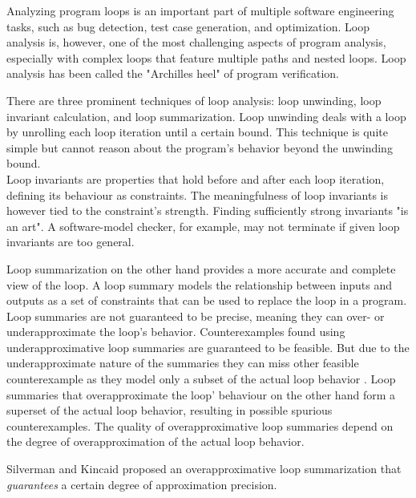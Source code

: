 Analyzing program loops is an important part of multiple software engineering tasks, such as bug detection, test case generation, and optimization. Loop analysis is, however, one of the most challenging aspects of program analysis, especially with complex loops that feature multiple paths and nested loops. Loop analysis has been called the "Archilles heel" of program verification\cite{DBLP:journals/fmsd/KroeningSTTW13}. \par
There are three prominent techniques of loop analysis: loop unwinding, loop invariant calculation, and loop summarization\cite{DBLP:journals/fmsd/KroeningSTTW13 , DBLP:conf/cav/SilvermanK19, DBLP:journals/tse/XieCZLLL19}. Loop unwinding deals with a loop by unrolling each loop iteration until a certain bound. This technique is quite simple but cannot reason about the program's behavior beyond the unwinding bound. \\
Loop invariants are properties that hold before and after each loop iteration, defining its behaviour as constraints. The meaningfulness of loop invariants is however tied to the constraint's strength. Finding sufficiently strong invariants "is an art"\cite{DBLP:journals/fmsd/KroeningSTTW13}. A software-model checker, for example, may not terminate if given loop invariants are too general. \par
Loop summarization on the other hand provides a more accurate and complete view of the loop. A loop summary models the relationship between inputs and outputs as a set of constraints that can be used to replace the loop in a program. Loop summaries are not guaranteed to be precise, meaning they can over- or underapproximate the loop's behavior. Counterexamples found using underapproximative loop summaries are guaranteed to be feasible. But due to the underapproximate nature of the summaries they can miss other feasible counterexample as they model only a subset of the actual loop behavior \cite{DBLP:journals/fmsd/KroeningLW15}. Loop summaries that overapproximate the loop' behaviour on the other hand form a superset of the actual loop behavior, resulting in possible spurious counterexamples. The quality of overapproximative loop summaries depend on the degree of overapproximation of the actual loop behavior.\\ \par
Silverman and Kincaid\cite{DBLP:conf/cav/SilvermanK19} proposed an overapproximative loop summarization that \textsl{guarantees} a certain degree of approximation precision.\\ \par 


